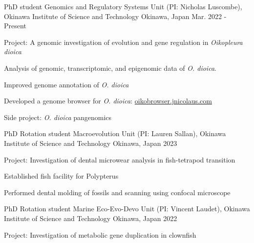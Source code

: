 

\begin{cventries}

  \cventry
    {PhD student} %
    {Genomics and Regulatory Systems Unit (PI: Nicholas Luscombe), Okinawa Institute of Science and Technology} %
    {Okinawa, Japan} %
    {Mar. 2022 - Present} %
    {
      \begin{cvitems} %
        \item {Project: A genomic investigation of evolution and gene regulation in \textit{Oikopleura dioica}}
        \item {Analysis of genomic, transcriptomic, and epigenomic data of \textit{O. dioica}.}
        \item {Improved genome annotation of \textit{O. dioica}}
        \item {Developed a genome browser for \textit{O. dioica}: \href{oikobrowser.jnicolaus.com}{oikobrowser.jnicolaus.com}}
        \item {Side project: \textit{O. dioica} pangenomics}
      \end{cvitems}
    }

  \cventry
    {PhD Rotation student} %
    {Macroevolution Unit (PI: Lauren Sallan), Okinawa Institute of Science and Technology} %
    {Okinawa, Japan} %
    {2023} %
    {
      \begin{cvitems} %
        \item {Project: Investigation of dental microwear analysis in fish-tetrapod transition}
        \item {Established fish facility for Polypterus}
        \item {Performed dental molding of fossils and scanning using confocal microscope}
      \end{cvitems}
    }

  \cventry
    {PhD Rotation student} %
    {Marine Eco-Evo-Devo Unit (PI: Vincent Laudet), Okinawa Institute of Science and Technology} %
    {Okinawa, Japan} %
    {2022} %
    {
      \begin{cvitems} %
        \item {Project: Investigation of metabolic gene duplication in clownfish}
      \end{cvitems}
    }


\end{cventries}
